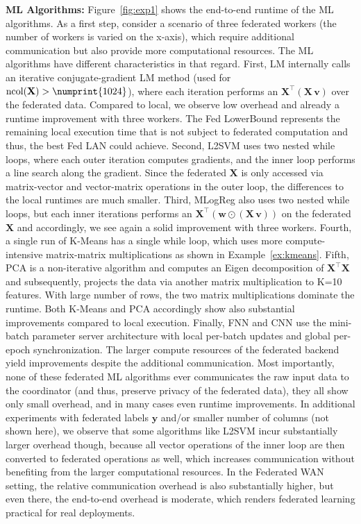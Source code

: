 \documentclass[sigconf,screen]{acmart}
\newcommand{\mat}[1]{\ensuremath{\mathbf{#1}}}
\newcommand{\num}[1]{\numprint{#1}}
\begin{document}
\textbf{ML Algorithms:} Figure~\ref{fig:exp1} shows the end-to-end runtime of the ML algorithms. As a first step, consider a scenario of three federated workers (the number of workers is varied on the x-axis), which require additional communication but also provide more computational resources. The ML algorithms have different characteristics in that regard. First, LM internally calls an iterative conjugate-gradient LM method (used for $\text{ncol}(\mat{X})>\num{1024}$), where each iteration performs an $\mat{X}^{\top}(\mat{X}\,\mat{v})$ over the federated data. Compared to local, we observe low overhead and already a runtime improvement with three workers. The Fed LowerBound represents the remaining local execution time that is not subject to federated computation and thus, the best Fed LAN could achieve. Second, L2SVM uses two nested while loops, where each outer iteration computes gradients, and the inner loop performs a line search along the gradient. Since the federated $\mat{X}$ is only accessed via matrix-vector and vector-matrix operations in the outer loop, the differences to the local runtimes are much smaller. Third, MLogReg also uses two nested while loops, but each inner iterations performs an $\mat{X}^{\top}(\mat{w}\odot(\mat{X}\,\mat{v}))$ on the federated $\mat{X}$ and accordingly, we see again a solid improvement with three workers. Fourth, a single run of K-Means has a single while loop, which uses more compute-intensive matrix-matrix multiplications as shown in Example~\ref{ex:kmeans}. Fifth, PCA is a non-iterative algorithm and computes an Eigen decomposition of $\mat{X}^{\top}\mat{X}$ and subsequently, projects the data via another matrix multiplication to K=10 features. With large number of rows, the two matrix multiplications dominate the runtime. Both K-Means and PCA accordingly show also substantial improvements compared to local execution. Finally, FNN and CNN use the mini-batch parameter server architecture with local per-batch updates and global per-epoch synchronization. The larger compute resources of the federated backend yield improvements despite the additional communication. Most importantly, none of these federated ML algorithms ever communicates the raw input data to the coordinator (and thus, preserve privacy of the federated data), they all show only small overhead, and in many cases even runtime improvements. In additional experiments with federated labels $\mat{y}$ and/or smaller number of columns (not shown here), we observe that some algorithms like L2SVM incur substantially larger overhead though, because all vector operations of the inner loop are then converted to federated operations as well, which increases communication without benefiting from the larger computational resources. In the Federated WAN setting, the relative communication overhead is also substantially higher, but even there, the end-to-end overhead is  moderate, which renders federated learning practical for real deployments.
\end{document}
